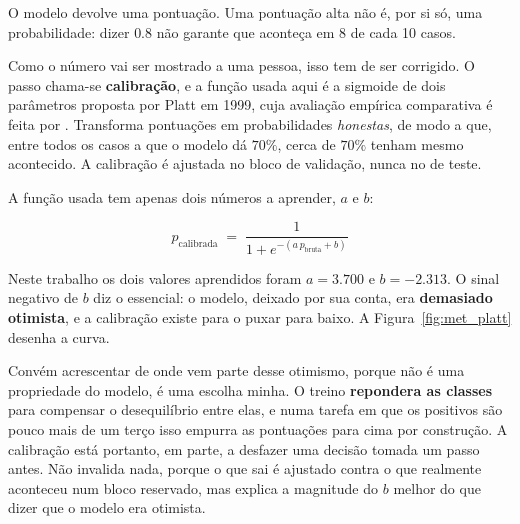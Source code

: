 O modelo devolve uma pontuação. Uma pontuação alta não é, por si só, uma probabilidade: dizer $0.8$
não garante que aconteça em 8 de cada 10 casos.

Como o número vai ser mostrado a uma pessoa, isso tem de ser corrigido. O passo chama-se
\textbf{calibração}, e a função usada aqui é a sigmoide de dois parâmetros proposta por Platt em
1999, cuja avaliação empírica comparativa é feita por \textcite{niculescu2005calibration}. Transforma
pontuações em probabilidades \emph{honestas}, de modo a que, entre todos os casos a que o modelo dá
$70\%$, cerca de $70\%$ tenham mesmo acontecido. A calibração é ajustada no bloco de validação, nunca
no de teste.

A função usada tem apenas dois números a aprender, $a$ e $b$:

\begin{equation}
  p_{\text{calibrada}} \;=\; \frac{1}{1 + e^{-\left(a\,p_{\text{bruta}} + b\right)}}
  \label{eq:platt}
\end{equation}

Neste trabalho os dois valores aprendidos foram $a = 3.700$ e $b = -2.313$. O sinal negativo de $b$
diz o essencial: o modelo, deixado por sua conta, era \textbf{demasiado otimista}, e a calibração
existe para o puxar para baixo. A Figura~\ref{fig:met_platt} desenha a curva.

Convém acrescentar de onde vem parte desse otimismo, porque não é uma propriedade do modelo, é uma
escolha minha. O treino \textbf{repondera as classes} para compensar o desequilíbrio entre elas, e
numa tarefa em que os positivos são pouco mais de um terço isso empurra as pontuações para cima por
construção. A calibração está portanto, em parte, a desfazer uma decisão tomada um passo antes. Não
invalida nada, porque o que sai é ajustado contra o que realmente aconteceu num bloco reservado,
mas explica a magnitude do $b$ melhor do que dizer que o modelo era otimista.

